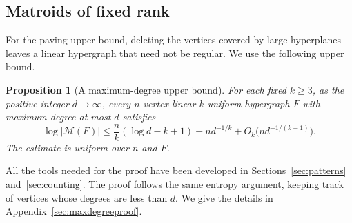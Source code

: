 \documentclass[11pt,reqno]{amsart}
\numberwithin{equation}{section}
\theoremstyle{plain}
\newtheorem{proposition}[theorem]{Proposition}
\theoremstyle{definition}
\newcommand{\calM}{\mathcal{M}}
\begin{document}
\subsection{Matroids of fixed rank}\label{subsec:matroidproofs}

For the paving upper bound, deleting the vertices covered by large hyperplanes leaves a linear hypergraph that need not be regular.
We use the following upper bound.

\begin{proposition}[A maximum-degree upper bound]\label{prop:maxdegree}
    For each fixed $k\ge3$, as the positive integer $d\to\infty$, every $n$-vertex linear $k$-uniform hypergraph $F$ with maximum degree at most $d$ satisfies
    \[
        \log|\calM(F)|\le\frac nk(\log d-k+1)+nd^{-1/k}
        +O_k\bigl(nd^{-1/(k-1)}\bigr).
    \]
    The estimate is uniform over $n$ and $F$.
\end{proposition}
All the tools needed for the proof have been developed in Sections~\ref{sec:patterns} and~\ref{sec:counting}.
The proof follows the same entropy argument, keeping track of vertices whose degrees are less than $d$.
We give the details in Appendix~\ref{sec:maxdegreeproof}.
\end{document}

